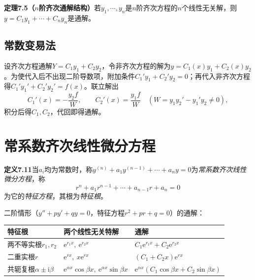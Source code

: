 \noindent\textbf{定理7.5（$n$阶齐次通解结构）}\quad 若$y_1,\cdots,y_n$是$n$阶齐次方程的$n$个线性无关解，则$y=C_1y_1+\cdots+C_ny_n$是通解。



\subsection{常数变易法}

\noindent 设齐次方程通解$Y=C_1y_1+C_2y_2$，令非齐次方程的解为$y=C_1(x)y_1+C_2(x)y_2$。为使代入后不出现二阶导数项，附加条件$C_1'y_1+C_2'y_2=0$；再代入非齐次方程得$C_1'y_1'+C_2'y_2'=f(x)$。联立解出
\[
C_1'(x)=-\frac{y_2f}{W},\qquad C_2'(x)=\frac{y_1f}{W}\quad(W=y_1y_2'-y_1'y_2\neq0),
\]
积分后得$C_1,C_2$，代回即得通解。


\section{常系数齐次线性微分方程}

\noindent\textbf{定义7.11}\quad 当$a_i$均为常数时，称$y^{(n)}+a_1y^{(n-1)}+\cdots+a_ny=0$为\emph{常系数齐次线性微分方程}，称
\[
r^n+a_1r^{n-1}+\cdots+a_{n-1}r+a_n=0
\]
为它的\emph{特征方程}，其根为\emph{特征根}。

\noindent 二阶情形（$y''+py'+qy=0$，特征方程$r^2+pr+q=0$）的通解：

\begin{center}
\begin{tabular}{@{}lll@{}}
\toprule
\textbf{特征根} & \textbf{两个线性无关特解} & \textbf{通解} \\
\midrule
两不等实根$r_1,r_2$ & $\mathrm{e}^{r_1x},\ \mathrm{e}^{r_2x}$ &
$C_1\mathrm{e}^{r_1x}+C_2\mathrm{e}^{r_2x}$ \\[4pt]
二重实根$r$ & $\mathrm{e}^{rx},\ x\mathrm{e}^{rx}$ &
$(C_1+C_2x)\mathrm{e}^{rx}$ \\[4pt]
共轭复根$\alpha\pm\mathrm{i}\beta$ &
$\mathrm{e}^{\alpha x}\cos\beta x,\ \mathrm{e}^{\alpha x}\sin\beta x$ &
$\mathrm{e}^{\alpha x}(C_1\cos\beta x+C_2\sin\beta x)$ \\
\bottomrule
\end{tabular}
\end{center}

